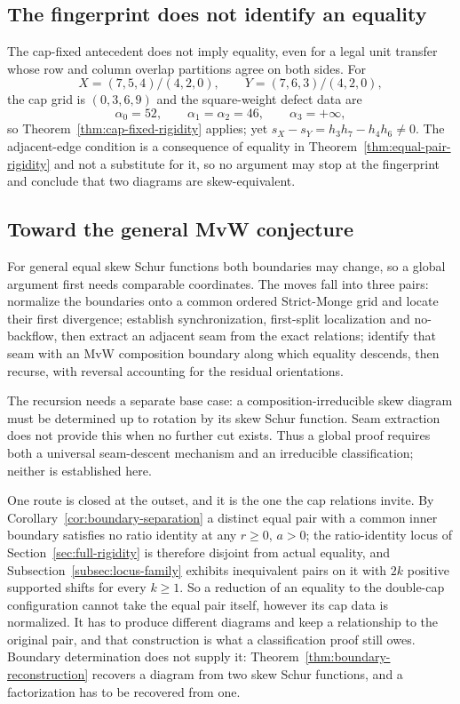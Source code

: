 \documentclass[11pt,a4paper]{amsart}
\numberwithin{equation}{section}
\theoremstyle{plain}
\theoremstyle{definition}
\begin{document}
\subsection{The fingerprint does not identify an equality}\label{subsec:fingerprint-not-classification}

The cap-fixed antecedent does not imply equality, even for a legal unit transfer whose row and column overlap partitions agree on both sides.  For
\[
X=(7,5,4)/(4,2,0),
\qquad
Y=(7,6,3)/(4,2,0),
\]
the cap grid is \((0,3,6,9)\) and the square-weight defect data are
\[
\alpha_0=52,
\qquad
\alpha_1=\alpha_2=46,
\qquad
\alpha_3=+\infty,
\]
so Theorem~\ref{thm:cap-fixed-rigidity} applies; yet \(s_X-s_Y=h_3h_7-h_4h_6\ne0\).
The adjacent-edge condition is a consequence of equality in Theorem~\ref{thm:equal-pair-rigidity} and not a substitute for it, so no argument may stop at the fingerprint and conclude that two diagrams are skew-equivalent.

\subsection{Toward the general MvW conjecture}\label{subsec:future}

For general equal skew Schur functions both boundaries may change, so a
global argument first needs comparable coordinates.  The moves fall
into three pairs: normalize the boundaries onto a common ordered
Strict-Monge grid and locate their first divergence; establish
synchronization, first-split localization and no-backflow, then extract an
adjacent seam from the exact relations; identify that seam with an MvW
composition boundary along which equality descends, then recurse, with
reversal accounting for the residual orientations.

The recursion needs a separate base case: a composition-irreducible skew
diagram must be determined up to rotation by its skew Schur function.
Seam extraction does not provide this when no further cut exists.  Thus a
global proof requires both a universal seam-descent mechanism and an
irreducible classification; neither is established here.

One route is closed at the outset, and it is the one the cap relations
invite.  By Corollary~\ref{cor:boundary-separation} a distinct equal pair
with a common inner boundary satisfies no ratio identity at any \(r\ge0\),
\(a>0\); the ratio-identity locus of Section~\ref{sec:full-rigidity} is
therefore disjoint from actual equality, and
Subsection~\ref{subsec:locus-family} exhibits inequivalent pairs on it with
\(2k\) positive supported shifts for every \(k\ge1\).  So a reduction of an equality to the
double-cap configuration cannot take the equal pair itself, however its cap
data is normalized.  It has to produce different diagrams and keep a
relationship to the original pair, and that construction is what a
classification proof still owes.  Boundary determination does not supply
it: Theorem~\ref{thm:boundary-reconstruction} recovers a diagram from two
skew Schur functions, and a factorization has to be recovered from one.
\end{document}
